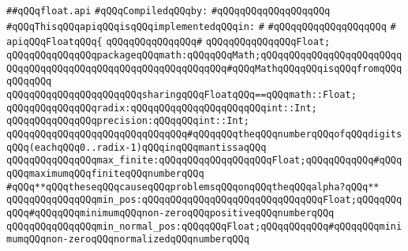 \label{src/lib/std/src/float.api}
\verb|##qQQqfloat.api|\newline
\newline
\verb|#qQQqCompiledqQQqby:|\newline
\verb|#qQQqqQQqqQQqqQQqqQQq|\newline
\newline
\verb|#qQQqThisqQQqapiqQQqisqQQqimplementedqQQqin:|\newline
\verb|#|\newline
\verb|#qQQqqQQqqQQqqQQqqQQq|\newline
\verb|#|\newline
\verb|apiqQQqFloatqQQq{|\newline
\verb|qQQqqQQqqQQqqQQq#|\newline
\verb|qQQqqQQqqQQqqQQqFloat;|\newline
\newline
\verb|qQQqqQQqqQQqqQQqpackageqQQqmath:qQQqqQQqMath;qQQqqQQqqQQqqQQqqQQqqQQqqQQqqQQqqQQqqQQqqQQqqQQqqQQqqQQqqQQqqQQq#qQQqMathqQQqqQQqisqQQqfromqQQqqQQqqQQq|\newline
\verb|qQQqqQQqqQQqqQQqqQQqqQQqsharingqQQqFloatqQQq==qQQqmath::Float;|\newline
\newline
\verb|qQQqqQQqqQQqqQQqradix:qQQqqQQqqQQqqQQqqQQqqQQqint::Int;|\newline
\verb|qQQqqQQqqQQqqQQqprecision:qQQqqQQqint::Int;|\newline
\verb|qQQqqQQqqQQqqQQqqQQqqQQqqQQqqQQq#qQQqqQQqtheqQQqnumberqQQqofqQQqdigitsqQQq(eachqQQq0..radix-1)qQQqinqQQqmantissaqQQq|\newline
\newline
\verb|qQQqqQQqqQQqqQQqmax_finite:qQQqqQQqqQQqqQQqqQQqFloat;qQQqqQQqqQQq#qQQqqQQqmaximumqQQqfiniteqQQqnumberqQQq|\newline
\verb|#qQQq**qQQqtheseqQQqcauseqQQqproblemsqQQqonqQQqtheqQQqalpha?qQQq**|\newline
\verb|qQQqqQQqqQQqqQQqmin_pos:qQQqqQQqqQQqqQQqqQQqqQQqqQQqqQQqFloat;qQQqqQQqqQQq#qQQqqQQqminimumqQQqnon-zeroqQQqpositiveqQQqnumberqQQq|\newline
\verb|qQQqqQQqqQQqqQQqmin_normal_pos:qQQqqQQqFloat;qQQqqQQqqQQq#qQQqqQQqminimumqQQqnon-zeroqQQqnormalizedqQQqnumberqQQq|\newline
\newline
